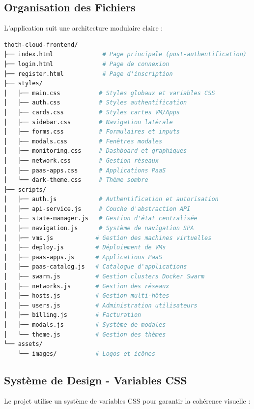 \documentclass[12pt,a4paper]{article}
\begin{document}
\subsection{Organisation des Fichiers}

L'application suit une architecture modulaire claire :

\begin{lstlisting}[language=bash,caption=Structure du projet]
thoth-cloud-frontend/
├── index.html              # Page principale (post-authentification)
├── login.html              # Page de connexion
├── register.html           # Page d'inscription
├── styles/
│   ├── main.css           # Styles globaux et variables CSS
│   ├── auth.css           # Styles authentification
│   ├── cards.css          # Styles cartes VM/Apps
│   ├── sidebar.css        # Navigation latérale
│   ├── forms.css          # Formulaires et inputs
│   ├── modals.css         # Fenêtres modales
│   ├── monitoring.css     # Dashboard et graphiques
│   ├── network.css        # Gestion réseaux
│   ├── paas-apps.css      # Applications PaaS
│   └── dark-theme.css     # Thème sombre
├── scripts/
│   ├── auth.js            # Authentification et autorisation
│   ├── api-service.js     # Couche d'abstraction API
│   ├── state-manager.js   # Gestion d'état centralisée
│   ├── navigation.js      # Système de navigation SPA
│   ├── vms.js            # Gestion des machines virtuelles
│   ├── deploy.js         # Déploiement de VMs
│   ├── paas-apps.js      # Applications PaaS
│   ├── paas-catalog.js   # Catalogue d'applications
│   ├── swarm.js          # Gestion clusters Docker Swarm
│   ├── networks.js       # Gestion des réseaux
│   ├── hosts.js          # Gestion multi-hôtes
│   ├── users.js          # Administration utilisateurs
│   ├── billing.js        # Facturation
│   ├── modals.js         # Système de modales
│   └── theme.js          # Gestion des thèmes
└── assets/
    └── images/           # Logos et icônes
\end{lstlisting}

\subsection{Système de Design - Variables CSS}

Le projet utilise un système de variables CSS pour garantir la cohérence visuelle :
\end{document}
